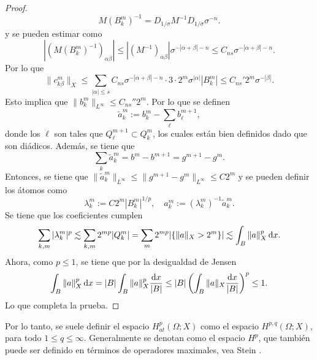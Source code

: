 \begin{proof}
	\begin{equation*}
		M({B_k^m})^{-1} = D_{1/\sigma}M^{-1}D_{1/\sigma}\sigma^{-n}.
	\end{equation*}
	y se pueden estimar como 
	\begin{equation*}
		|(M({B_k^m})^{-1})_{\alpha\beta} | \leq |(M^{-1})_{\alpha\beta}| \sigma^{-|\alpha+\beta|-n} \leq C_{ns}\sigma^{-|\alpha+\beta|-n}.
	\end{equation*}
	Por lo que 
	\begin{equation*}
		\|c_{k\beta}^m\|_X\leq \sum_{|\alpha|\leq s} C_{ns}\sigma^{-|\alpha+\beta|-n} \cdot 3\cdot2^m\sigma^{|\alpha|}|{B_k^m}| \leq C_{ns}' 2^m\sigma^{-|\beta|}.
	\end{equation*}
	Esto implica que $\|b_k^m\|_{L^\infty} \leq C_{ns}'' 2^m$. Por lo que se definen 
	\begin{equation*}
		\tilde{a}_k^m := b_k^m - \sum_\ell b_\ell^{m+1}, 
	\end{equation*}
	donde los $\ell$ son tales que $Q_\ell^{m+1} \subset Q_k^m$, los cuales están bien definidos dado que son diádicos. Además, se tiene que 
	\begin{equation*}
		 \sum_k \tilde{a}_k^m = b^m - b^{m+1} = g^{m+1 }- g^m.
	\end{equation*} 
	Entonces, se tiene que $\|\tilde{a}_k^m\|_{L^\infty} \leq \|g^{m+1 }- g^m\|_{L^\infty} \leq C 2^m$ y se pueden definir los átomos como
	\begin{equation*}
		\lambda_k^m := C2^m|B_k^m|^{1/p}, \quad a_k^m := (\lambda_k^m)^{-1}\tilde{a}_k^m.
	\end{equation*} 
	Se tiene que los coeficientes cumplen 
	\begin{equation*}
		\sum_{k,m}|\lambda_k^m|^p \lesssim \sum_{k,m} 2^{mp}|Q_k^m| = \sum_m 2^{mp}|\{\|a\|_X > 2^m\}|\lesssim \int_B \|a\|_X^p \mathop{}\!\mathrm{d} x.
	\end{equation*}
	Ahora, como $p\leq 1$, se tiene que por la desigualdad de Jensen
	\begin{equation*}
		\int_B \|a\|_X^p \mathop{}\!\mathrm{d} x = |B|\int_B \|a\|_X^p \frac{\mathop{}\!\mathrm{d} x}{|B|} \leq |B| \left(\int_B \|a\|_X \frac{\mathop{}\!\mathrm{d} x}{|B|} \right)^p \leq 1.
	\end{equation*}
	Lo que completa la prueba.
\end{proof}
\begin{remark}
	Por lo tanto, se suele definir el espacio $H^p_{at}(\Omega;X)$ como el espacio $H^{p,q}(\Omega;X)$, para todo $1\leq q \leq \infty$. Generalmente se denotan como el espacio $H^p$, que también puede ser definido en términos de operadores maximales, vea Stein \cite{stein}.
\end{remark}
